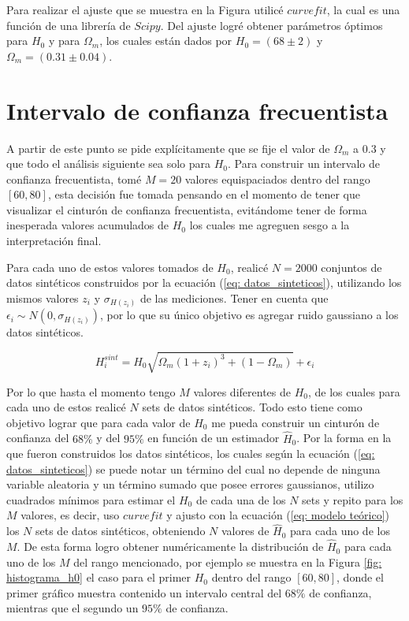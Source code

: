 \documentclass[]{article}
\begin{document}
Para realizar el ajuste que se muestra en la Figura utilicé $curvefit$, la cual es una función de una librería de $Scipy$. Del ajuste logré obtener parámetros óptimos para $H_0$ y para $\Omega_m$, los
cuales están dados por $H_0 = \left( 68 \pm 2\right)$ y $\Omega_m = \left( 0.31 \pm 0.04\right)$.

\section{Intervalo de confianza frecuentista}
A partir de este punto se pide explícitamente que se fije el valor de $\Omega_m$ a $0.3$ y que todo el análisis siguiente sea solo para $H_0$. Para construir un intervalo de
confianza frecuentista, tomé $M = 20$ valores equispaciados dentro del rango $\left[60, 80\right]$, esta decisión fue tomada pensando en el momento de tener que visualizar el
cinturón de confianza frecuentista, evitándome tener de forma inesperada valores acumulados de $H_0$ los cuales me agreguen sesgo a la interpretación final.

Para cada uno de estos valores tomados de $H_0$, realicé $N = 2000$ conjuntos de datos sintéticos construidos por la ecuación (\ref{eq: datos_sinteticos}), 
utilizando los mismos valores $z_i$ y $\sigma_{H\left(z_i\right)}$ de las mediciones. Tener en cuenta que $\epsilon_i \sim N\left( 0, \sigma_{H\left( z_i \right)} \right)$, por lo que
su único objetivo es agregar ruido gaussiano a los datos sintéticos.

\begin{equation}
    H^{sint}_i = H_0 \sqrt{\Omega_m \left( 1 + z_i \right)^3 + \left( 1 - \Omega_m \right)} + \epsilon_i
    \label{eq: datos_sinteticos}
\end{equation}

Por lo que hasta el momento tengo $M$ valores diferentes de $H_0$, de los cuales para cada uno de estos realicé $N$ sets de datos sintéticos. Todo esto tiene como objetivo lograr
que para cada valor de $H_0$ me pueda construir un cinturón de confianza del $68\%$ y del $95\%$ en función de un estimador $\hat{H}_0$. Por la forma en la que fueron construidos
los datos sintéticos, los cuales según la ecuación (\ref{eq: datos_sinteticos}) se puede notar un término del cual no depende de ninguna variable aleatoria y un término sumado que
posee errores gaussianos, utilizo cuadrados mínimos para estimar el $H_0$ de cada una de los $N$ sets y repito para los $M$ valores, es decir, uso $curvefit$ y ajusto con la ecuación 
(\ref{eq: modelo teórico}) los $N$ sets de datos sintéticos, obteniendo $N$ valores de $\hat{H}_0$ para cada uno de los $M$. De esta forma logro obtener numéricamente la distribución 
de $\hat{H}_0$ para cada uno de los $M$ del rango mencionado, por ejemplo se muestra en la Figura \ref{fig: histograma_h0} el caso para el primer $H_0$ dentro del rango 
$\left[60, 80\right]$, donde el primer gráfico muestra contenido un intervalo central del $68\%$ de confianza, mientras que el segundo un $95\%$ de confianza.
\end{document}
